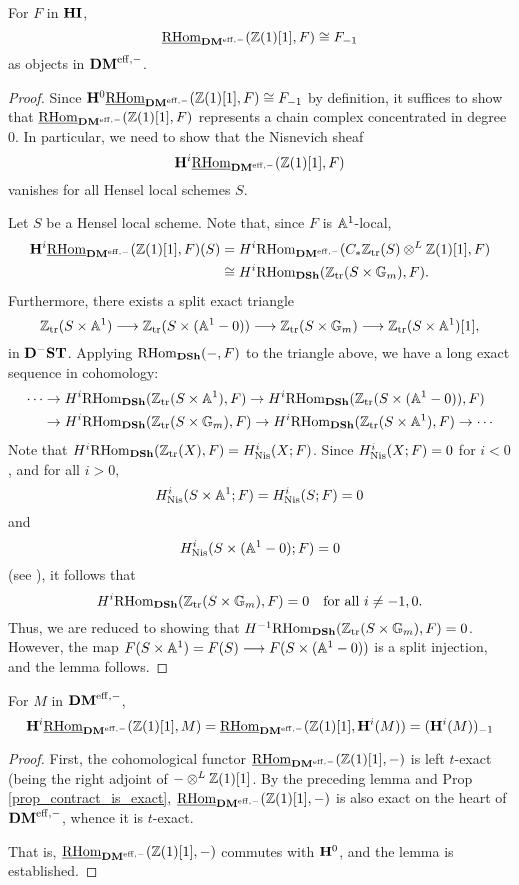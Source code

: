 \begin{lem}\label{lem_rhomDM_and_contract}
For $F$ in $\HI$,
\[
\ihomDMf(\Z(1)[1], F) \cong \RHI{F}
\]
as objects in $\DMeff$.
\end{lem}
\begin{proof}
Since $\HH^0 \ihomDMf(\Z(1)[1], F) \cong \RHI{F}$ by definition, 
it suffices to show that $\ihomDMf(\Z(1)[1], F)$ represents a 
chain complex concentrated in degree 0. In particular, we need
to show that the Nisnevich sheaf
\[
\HH^i\ihomDMf(\Z(1)[1], F)
\]
vanishes for all Hensel local schemes $S$.

Let $S$ be a Hensel local scheme. Note that, since $F$ is 
$\A^1$-local,
\begin{align*}
\HH^i\ihomDMf(\Z(1)[1], F)(S) &= H^i\rhomDMf(\CZtr(S) 
   \tDM \Z(1)[1], F) \\
   &\cong H^i\homDSh(\Ztr(S \times 
   \Gm), F).
\end{align*}
Furthermore, there exists a split exact triangle
\[
\Ztr(S \times \A^1) \to \Ztr(S \times (\A^1 - 0)) \to 
   \Ztr(S \times \Gm) \to \Ztr(S \times \A^1)[1],
\]
in $\DShCor$. Applying $\homDSh(-, F)$ to the triangle above, we 
have a long exact sequence in cohomology:
\begin{align*}
\cdots & \rightarrow H^i\homDSh(\Ztr(S \times \A^1), F) 
   \rightarrow H^i\homDSh(\Ztr(S \times (\A^1 - 0)), F) \\
 & \rightarrow H^i\homDSh(\Ztr(S \times \Gm), F) \rightarrow 
   H^i\homDSh(\Ztr(S \times \A^1), F) \rightarrow \cdots
\end{align*}
Note that $H^i\homDSh(\Ztr(X), F) = H_{\Nis}^i(X; F)$. Since
$H^i_{\Nis}(X; F) = 0$ for $i < 0$, and for all $i > 0$, 
\[
H_{\Nis}^i(S \times \A^1; F) = H_{\Nis}^i(S; F) = 0
\] 
and 
\[
H_{\Nis}^i(S \times (\A^1 - 0); F) = 0
\] 
(see \cite[24.5]{MVW}), it follows that 
\[
H^i\homDSh(\Ztr(S \times \Gm), F) = 0 \quad\textrm{for all $i \neq -1, 0$.}
\] 
Thus, we are reduced to showing that $H^{-1}\homDSh(\Ztr(S \times 
\Gm), F) = 0$. However, the map $F(S \times \A^1) = F(S) \to F(S 
\times (\A^1 - 0))$ is a split injection, and the lemma follows.
\end{proof}

\begin{lem}\label{lem_H_com_ihom_DM}
For $M$ in $\DMeff$, 
\[
\HH^i\ihomDMf(\Z(1)[1], M) = \ihomDMf(\Z(1)[1], \HH^i(M)) = 
   \RHI{(\HH^i(M))}
\]
\end{lem}
\begin{proof}
First, the cohomological functor $\ihomDMf(\Z(1)[1], -)$ is left 
$t$-exact (being the right adjoint of $-\tDM \Z(1)[1]$. By the 
preceding lemma and Prop \ref{prop_contract_is_exact},
$\ihomDMf(\Z(1)[1], -)$ is also exact on the heart of $\DMeff$,
whence it is $t$-exact.

That is, $\ihomDMf(\Z(1)[1], -)$ commutes with $\HH^0$,
and the lemma is established.
\end{proof}

